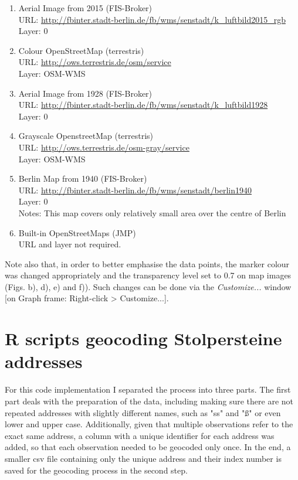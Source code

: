 \begin{enumerate}[label=(\alph*)]\setlength{\itemsep}{-5pt}
	\item Aerial Image from 2015 (FIS-Broker) \\
	URL: \url{http://fbinter.stadt-berlin.de/fb/wms/senstadt/k_luftbild2015_rgb} \\
	Layer: 0
	
	\item Colour OpenStreetMap (terrestris) \\
	URL: \url{http://ows.terrestris.de/osm/service} \\
	Layer: OSM-WMS
	
	\item Aerial Image from 1928 (FIS-Broker)\\
	URL: \url{http://fbinter.stadt-berlin.de/fb/wms/senstadt/k_luftbild1928} \\
	Layer: 0
	
	\item Grayscale OpenstreetMap (terrestris)\\
	URL: \url{http://ows.terrestris.de/osm-gray/service}\\
	Layer: OSM-WMS
	
	\item Berlin Map from 1940 (FIS-Broker)\\
	URL: \url{http://fbinter.stadt-berlin.de/fb/wms/senstadt/berlin1940}\\
	Layer: 0\\
	Notes: This map covers only relatively small area over the centre of Berlin
	
	\item Built-in OpenStreetMaps (JMP)\\
	URL and layer not required.
\end{enumerate}

\noindent Note also that, in order to better emphasise the data points, the marker colour was changed appropriately and the transparency level set to 0.7 on map images (Figs. b), d), e) and f)). Such changes can be done via the \textit{Customize...} window [on Graph frame: Right-click > Customize...].




\section{R scripts geocoding Stolpersteine addresses}
\label{sec:appendix_geocode}

For this code implementation I separated the process into three parts. The first part deals with the preparation of the data, including making sure there are not repeated addresses with slightly different names, such as "ss" and "ß" or even lower and upper case. Additionally, given that multiple observations refer to the exact same address, a column with a unique identifier for each address was added, so that each observation needed to be geocoded only once.  In the end, a smaller csv file containing only the unique address and their index number is saved for the geocoding process in the second step.


